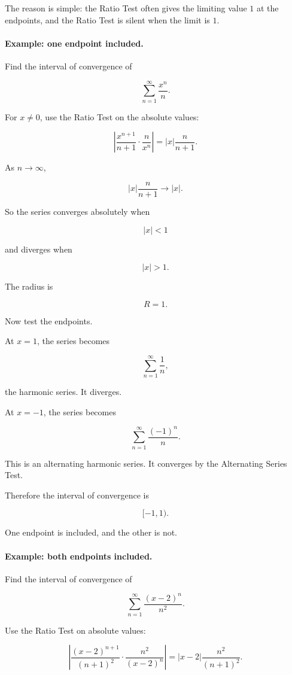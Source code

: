 The reason is simple: the Ratio Test often gives the limiting value \(1\) at the endpoints,
and the Ratio Test is silent when the limit is \(1\).

\paragraph{Example: one endpoint included.}
Find the interval of convergence of

\[
\sum_{n=1}^{\infty}\frac{x^n}{n}.
\]

For \(x\neq0\), use the Ratio Test on the absolute values:

\[
\left|
\frac{x^{n+1}}{n+1}\cdot\frac{n}{x^n}
\right|
=
|x|\frac{n}{n+1}.
\]

As \(n\to\infty\),

\[
|x|\frac{n}{n+1}\to |x|.
\]

So the series converges absolutely when

\[
|x|<1
\]

and diverges when

\[
|x|>1.
\]

The radius is

\[
R=1.
\]

Now test the endpoints.

At \(x=1\), the series becomes

\[
\sum_{n=1}^{\infty}\frac1n,
\]

the harmonic series.  It diverges.

At \(x=-1\), the series becomes

\[
\sum_{n=1}^{\infty}\frac{(-1)^n}{n}.
\]

This is an alternating harmonic series.  It converges by the Alternating Series Test.

Therefore the interval of convergence is

\[
\boxed{[-1,1).}
\]

One endpoint is included, and the other is not.

\paragraph{Example: both endpoints included.}
Find the interval of convergence of

\[
\sum_{n=1}^{\infty}\frac{(x-2)^n}{n^2}.
\]

Use the Ratio Test on absolute values:

\[
\left|
\frac{(x-2)^{n+1}}{(n+1)^2}\cdot \frac{n^2}{(x-2)^n}
\right|
=
|x-2|\frac{n^2}{(n+1)^2}.
\]

